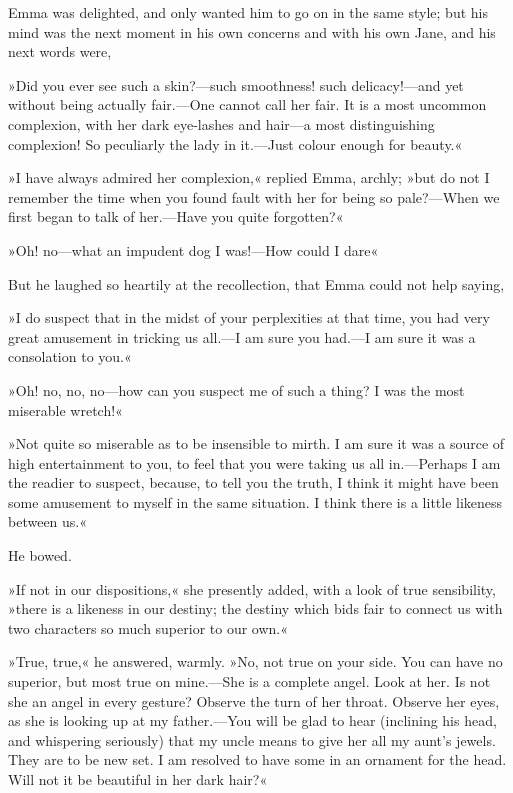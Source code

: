 Emma was delighted, and only wanted him to go on in the same style; but his mind was the next moment in his own concerns and with his own Jane, and his next words were,

»Did you ever see such a skin?—such smoothness! such delicacy!—and yet without being actually fair.—One cannot call her fair. It is a most uncommon complexion, with her dark eye-lashes and hair—a most distinguishing complexion! So peculiarly the lady in it.—Just colour enough for beauty.«

»I have always admired her complexion,« replied Emma, archly; »but do not I remember the time when you found fault with her for being so pale?—When we first began to talk of her.—Have you quite forgotten?«

»Oh! no—what an impudent dog I was!—How could I dare\longdash«

But he laughed so heartily at the recollection, that Emma could not help saying,

»I do suspect that in the midst of your perplexities at that time, you had very great amusement in tricking us all.—I am sure you had.—I am sure it was a consolation to you.«

»Oh! no, no, no—how can you suspect me of such a thing? I was the most miserable wretch!«

»Not quite so miserable as to be insensible to mirth. I am sure it was a source of high entertainment to you, to feel that you were taking us all in.—Perhaps I am the readier to suspect, because, to tell you the truth, I think it might have been some amusement to myself in the same situation. I think there is a little likeness between us.«

He bowed.

»If not in our dispositions,« she presently added, with a look of true sensibility, »there is a likeness in our destiny; the destiny which bids fair to connect us with two characters so much superior to our own.«

»True, true,« he answered, warmly. »No, not true on your side. You can have no superior, but most true on mine.—She is a complete angel. Look at her. Is not she an angel in every gesture? Observe the turn of her throat. Observe her eyes, as she is looking up at my father.—You will be glad to hear (inclining his head, and whispering seriously) that my uncle means to give her all my aunt's jewels. They are to be new set. I am resolved to have some in an ornament for the head. Will not it be beautiful in her dark hair?«

